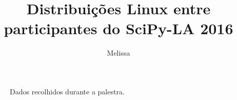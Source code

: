 \documentclass{article}
\title{ Distribuições Linux entre participantes do SciPy-LA 2016 }
\author{ Melissa }
\date{  }
\begin{document}
\maketitle
\newcommand{\slice}[5]{\pgfmathparse{0.5*#1+0.5*#2}\let\midangle\pgfmathresult \draw[thick,fill=blue!#5!white] (0,0) -- (#1:1) arc (#1:#2:1) -- cycle; \node[label=\midangle:#4] at (\midangle:1) {}; \pgfmathparse{min((#2-#1-10)/110*(-0.3),0)} \let\temp\pgfmathresult \pgfmathparse{max(\temp,-0.5) + 0.8} \let\innerpos\pgfmathresult \node[rectangle] at (\midangle:\innerpos) {#3};} 
 \begin{figure}[ht] 
 \begin{center} 
 \end{center} 
 \caption{Dados recolhidos durante a palestra.} 
 \end{figure}
\end{document}
